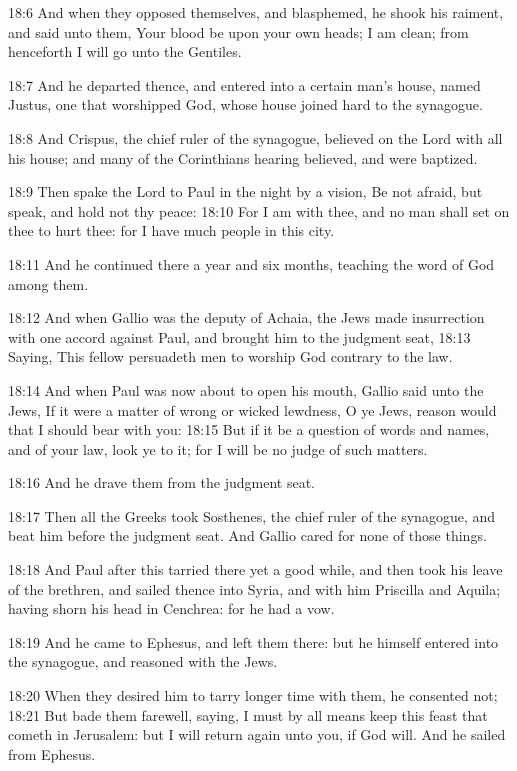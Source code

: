 18:6 And when they opposed themselves, and blasphemed, he shook his
raiment, and said unto them, Your blood be upon your own heads; I am
clean; from henceforth I will go unto the Gentiles.

18:7 And he departed thence, and entered into a certain man's house,
named Justus, one that worshipped God, whose house joined hard to the
synagogue.

18:8 And Crispus, the chief ruler of the synagogue, believed on the
Lord with all his house; and many of the Corinthians hearing believed,
and were baptized.

18:9 Then spake the Lord to Paul in the night by a vision, Be not
afraid, but speak, and hold not thy peace: 18:10 For I am with thee,
and no man shall set on thee to hurt thee: for I have much people in
this city.

18:11 And he continued there a year and six months, teaching the word
of God among them.

18:12 And when Gallio was the deputy of Achaia, the Jews made
insurrection with one accord against Paul, and brought him to the
judgment seat, 18:13 Saying, This fellow persuadeth men to worship God
contrary to the law.

18:14 And when Paul was now about to open his mouth, Gallio said unto
the Jews, If it were a matter of wrong or wicked lewdness, O ye Jews,
reason would that I should bear with you: 18:15 But if it be a
question of words and names, and of your law, look ye to it; for I
will be no judge of such matters.

18:16 And he drave them from the judgment seat.

18:17 Then all the Greeks took Sosthenes, the chief ruler of the
synagogue, and beat him before the judgment seat. And Gallio cared for
none of those things.

18:18 And Paul after this tarried there yet a good while, and then
took his leave of the brethren, and sailed thence into Syria, and with
him Priscilla and Aquila; having shorn his head in Cenchrea: for he
had a vow.

18:19 And he came to Ephesus, and left them there: but he himself
entered into the synagogue, and reasoned with the Jews.

18:20 When they desired him to tarry longer time with them, he
consented not; 18:21 But bade them farewell, saying, I must by all
means keep this feast that cometh in Jerusalem: but I will return
again unto you, if God will. And he sailed from Ephesus.

